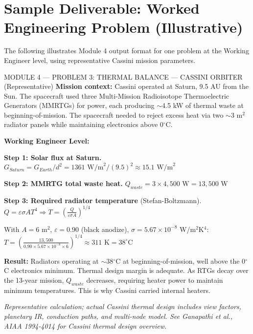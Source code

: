 \documentclass[11pt,letterpaper]{article}
\begin{document}
\section{Sample Deliverable: Worked Engineering Problem (Illustrative)}

The following illustrates Module 4 output format for one problem at the Working Engineer level, using representative Cassini mission parameters.

\begin{mathbox}{MODULE 4 — PROBLEM 3: THERMAL BALANCE — CASSINI ORBITER (Representative)}
\textbf{Mission context:} Cassini operated at Saturn, 9.5 AU from the Sun. The spacecraft used three Multi-Mission Radioisotope Thermoelectric Generators (MMRTGs) for power, each producing $\sim$4.5 kW of thermal waste at beginning-of-mission. The spacecraft needed to reject excess heat via two $\sim$3 m$^2$ radiator panels while maintaining electronics above 0$^\circ$C.

\textbf{Working Engineer Level:}

\textbf{Step 1: Solar flux at Saturn.}
$G_{Saturn} = G_{Earth}/d^2 = 1361 \text{ W/m}^2 / (9.5)^2 \approx 15.1 \text{ W/m}^2$

\textbf{Step 2: MMRTG total waste heat.}
$Q_{waste} = 3 \times 4{,}500 \text{ W} = 13{,}500 \text{ W}$

\textbf{Step 3: Required radiator temperature} (Stefan-Boltzmann).
$Q = \varepsilon \sigma A T^4 \Rightarrow T = \left(\frac{Q}{\varepsilon \sigma A}\right)^{1/4}$

With $A = 6 \text{ m}^2$, $\varepsilon = 0.90$ (black anodize), $\sigma = 5.67 \times 10^{-8}$ W/m$^2$K$^4$:
$T = \left(\frac{13{,}500}{0.90 \times 5.67 \times 10^{-8} \times 6}\right)^{1/4} \approx 311 \text{ K} = 38^\circ\text{C}$\dagger

\textbf{Result:} Radiators operating at $\sim$38$^\circ$C at beginning-of-mission, well above the 0$^\circ$C electronics minimum. Thermal design margin is adequate. As RTGs decay over the 13-year mission, $Q_{waste}$ decreases, requiring heater power to maintain minimum temperatures. This is why Cassini carried internal heaters.

\textit{\small \dagger Representative calculation; actual Cassini thermal design includes view factors, planetary IR, conduction paths, and multi-node model. See Ganapathi et al., AIAA 1994-4014 for Cassini thermal design overview.}
\end{mathbox}
\end{document}
